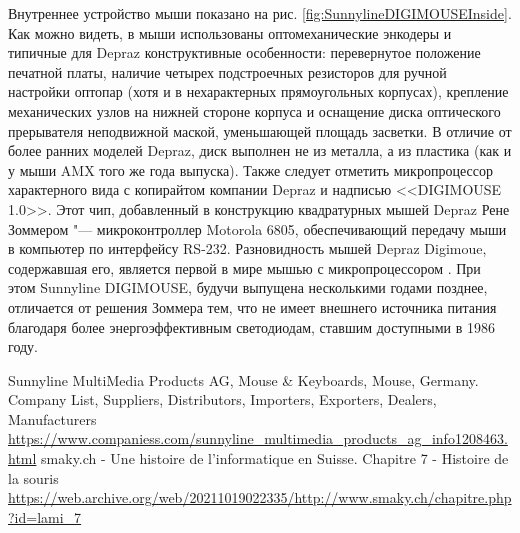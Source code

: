 \documentclass[11pt, a4paper]{article}
\begin{document}
Внутреннее устройство мыши показано на рис. \ref{fig:SunnylineDIGIMOUSEInside}. Как можно видеть, в мыши использованы оптомеханические энкодеры и типичные для Depraz конструктивные особенности: перевернутое положение печатной платы, наличие четырех подстроечных резисторов для ручной настройки оптопар (хотя и в нехарактерных прямоугольных корпусах), крепление механических узлов на нижней стороне корпуса и оснащение диска оптического прерывателя неподвижной маской, уменьшающей площадь засветки. В отличие от более ранних моделей Depraz, диск  выполнен не из металла, а из пластика (как и у мыши AMX того же года выпуска). Также следует отметить микропроцессор характерного вида с копирайтом компании Depraz и надписью <<DIGIMOUSE 1.0>>. Этот чип, добавленный в конструкцию квадратурных мышей Depraz Рене Зоммером "--- микроконтроллер Motorola 6805, обеспечивающий передачу мыши в компьютер по интерфейсу RS-232. Разновидность мышей Depraz Digimoue, содержавшая его, является первой в мире мышью с микропроцессором \cite{smaky}. При этом Sunnyline DIGIMOUSE, будучи выпущена несколькими годами позднее, отличается от решения Зоммера тем, что не имеет внешнего источника питания благодаря более энергоэффективным светодиодам, ставшим доступными в 1986 году.




\begin{thebibliography}{9}
 Sunnyline MultiMedia Products AG, Mouse \& Keyboards, Mouse, Germany. Company List, Suppliers, Distributors, Importers, Exporters, Dealers, Manufacturers \url{https://www.companiess.com/sunnyline_multimedia_products_ag_info1208463.html}
 smaky.ch - Une histoire de l'informatique en Suisse. Chapitre 7 - Histoire de la souris \url{https://web.archive.org/web/20211019022335/http://www.smaky.ch/chapitre.php?id=lami_7}
\end{thebibliography}
\end{document}
